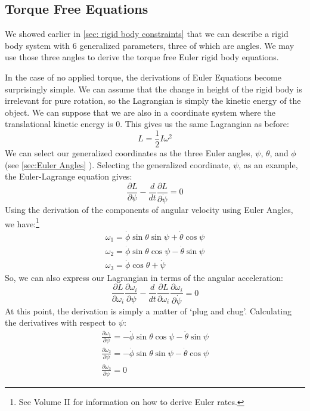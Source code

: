 \documentclass[10pt, openany, titlepage]{book}
\theoremstyle{definition}
\newcounter{example}[chapter]
\let\oldautoref\autoref
\renewcommand{\autoref}[1]{%
  \begingroup
  \hypersetup{linkcolor=black}%
  \oldautoref{#1}%
  \endgroup
}
\begin{document}
\subsection{Torque Free Equations}
We showed earlier in \autoref{sec: rigid body constraints} that we can describe a \gls{rigid body} system with 6 generalized parameters, three of which are angles. We may use those three angles to derive the torque free Euler rigid body equations.

In the case of no applied torque, the derivations of \glspl{Euler Equation} become surprisingly simple. We can assume that the change in height of the \gls{rigid body} is irrelevant for pure rotation, so the \gls{Lagrangian} is simply the kinetic energy of the object. We can suppose that we are also in a coordinate system where the translational kinetic energy is 0. This gives us the same \gls{Lagrangian}  as before:
\begin{equation}\label{eq:rigid body KE}
L=\frac{1}{2}I\omega^2
\end{equation}
We can select our \glspl{generalized coordinate} as the three Euler angles, $\psi$, $\theta$, and $\phi$ (see \autoref{sec:Euler Angles}). Selecting the \gls{generalized coordinate}, $\psi$, as an example, the Euler-Lagrange equation gives:
$$\frac{\partial L}{\partial \psi}-\frac{d}{dt}\frac{\partial L}{\partial \dot{\psi}}=0$$
Using the derivation of the components of angular velocity using Euler Angles, we have:\footnote{See Volume II for information on how to derive Euler rates.}
\begin{gather}
\omega_1=\dot{\phi}\sin\theta\sin\psi+\dot{\theta}\cos\psi\\
    \omega_2=\dot{\phi}\sin\theta\cos\psi-\dot{\theta}\sin\psi\\
    \omega_3=\dot{\phi}\cos\theta+\dot{\psi}
\end{gather}
So, we can also express our \gls{Lagrangian} in terms of the angular acceleration:
$$\frac{\partial L}{\partial \omega_i}\frac{\partial \omega_i}{\partial \psi}-\frac{d}{dt}\frac{\partial L}{\partial \omega_i}\frac{\partial \omega_i}{\partial \dot{\psi}}=0$$
At this point, the derivation is simply a matter of `plug and chug'. Calculating the derivatives with respect to $\psi$:
\begin{gather}
    \frac{\partial \omega_1}{\partial \psi}=-\dot{\phi}\sin\theta\cos\psi-\dot{\theta}\sin\psi\\
    \frac{\partial \omega_2}{\partial \psi}=-\dot{\phi}\sin\theta\sin\psi-\dot{\theta}\cos\psi\\
    \frac{\partial \omega_3}{\partial \psi}=0
\end{gather}
\end{document}
